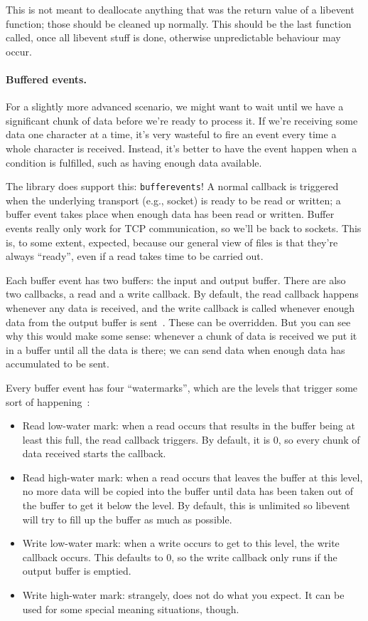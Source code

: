 \documentclass[a4paper]{report}
\begin{document}
This is not meant to deallocate anything that was the return value of a libevent function; those should be cleaned up normally. This should be the last function called, once all libevent stuff is done, otherwise unpredictable behaviour may occur.

\paragraph{Buffered events.} For a slightly more advanced scenario, we might want to wait until we have a significant chunk of data before we're ready to process it. If we're receiving some data one character at a time, it's very wasteful to fire an event every time a whole character is received. Instead, it's better to have the event happen when a condition is fulfilled, such as having enough data available.

The library does support this: \texttt{bufferevents}! A normal callback is triggered when the underlying transport (e.g., socket) is ready to be read or written; a buffer event takes place when enough data has been read or written. Buffer events really only work for TCP communication, so we'll be back to sockets. This is, to some extent, expected, because our general view of files is that they're always ``ready'', even if a read takes time to be carried out.

Each buffer event has two buffers: the input and output buffer. There are also two callbacks, a read and a write callback. By default, the read callback happens whenever any data is received, and the write callback is called whenever enough data from the output buffer is sent~\cite{libevent}. These can be overridden. But you can see why this would make some sense: whenever a chunk of data is received we put it in a buffer until all the data is there; we can send data when enough data has accumulated to be sent.

Every buffer event has four ``watermarks'', which are the levels that trigger some sort of happening~\cite{libevent}:
\begin{itemize}
	\item Read low-water mark: when a read occurs that results in the buffer being at least this full, the read callback triggers. By default, it is 0, so every chunk of data received starts the callback.
	\item Read high-water mark: when a read occurs that leaves the buffer at this level, no more data will be copied into the buffer until data has been taken out of the buffer to get it below the level. By default, this is unlimited so libevent will try to fill up the buffer as much as possible.
	\item Write low-water mark: when a write occurs to get to this level, the write callback occurs. This defaults to 0, so the write callback only runs if the output buffer is emptied.
	\item Write high-water mark: strangely, does not do what you expect. It can be used for some special meaning situations, though.
\end{itemize}
\end{document}
